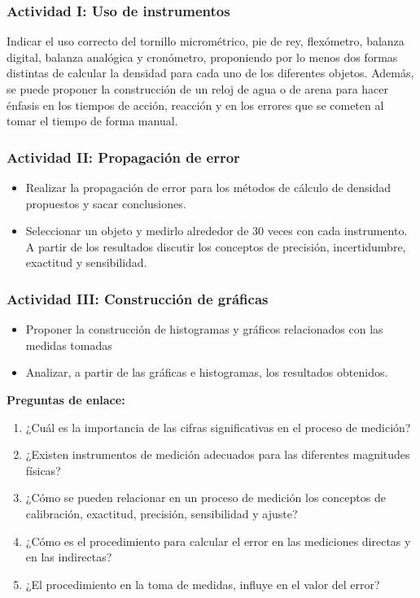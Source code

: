 \documentclass[12pt]{article}
\begin{document}
\subsubsection{Actividad I: Uso de instrumentos}
Indicar el uso correcto del tornillo micrométrico, pie de rey, flexómetro, balanza digital, balanza analógica y cronómetro, proponiendo por lo menos dos formas distintas de calcular la densidad para cada uno de los diferentes objetos. Además, se puede proponer la construcción de un reloj de agua o de arena para hacer énfasis en los tiempos de acción, reacción y en los errores que se cometen al tomar el tiempo de forma manual.

\subsubsection{Actividad II: Propagación de error}

\begin{itemize}
    \item Realizar la propagación de error para los métodos de cálculo de densidad propuestos y sacar conclusiones.
    \item Seleccionar un objeto y medirlo alrededor de 30 veces con cada instrumento. A partir de los resultados discutir los conceptos de precisión, incertidumbre, exactitud y sensibilidad.
\end{itemize}

\subsubsection{Actividad III: Construcción de gráficas}

\begin{itemize}
    \item Proponer la construcción de histogramas y gráficos relacionados con las medidas tomadas
    \item Analizar, a partir de las gráficas e histogramas, los resultados obtenidos.
    
\end{itemize}

\textbf{Preguntas de enlace:}
\begin{enumerate}
    \item ¿Cuál es la importancia de las cifras significativas en el proceso de medición?
    \item ¿Existen instrumentos de medición adecuados para las diferentes magnitudes físicas?
    \item ¿Cómo se pueden relacionar en un proceso de medición los conceptos de calibración, exactitud, precisión, sensibilidad y ajuste?
    \item ¿Cómo es el procedimiento para calcular el error en las mediciones directas y en las indirectas?
    \item ¿El procedimiento en la toma de medidas, influye en el valor del error?
\end{enumerate}
\end{document}
